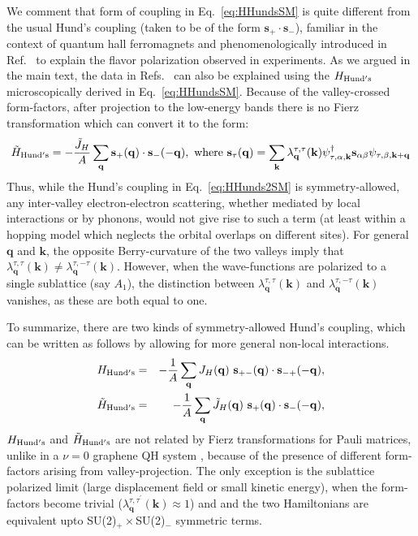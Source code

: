 \documentclass[aps,pra,twocolumn,superscriptaddress,10pt,article,nofootinbib,showpacs,longbibliography]{revtex4-1}
\def \k{{\mathbf k}}
\def \q{{\mathbf q}}
\def \s{{\mathbf s}}
\def \beq{\begin{eqnarray}}
\def \eeq{\end{eqnarray}}
\begin{document}
We comment that form of coupling in Eq.~\eqref{eq:HHundsSM} is quite different from the usual Hund's coupling (taken to be of the form $\s_+ \cdot \s_-$), familiar in the context of quantum hall ferromagnets and phenomenologically introduced in Ref.~ to explain the flavor polarization observed in experiments.
As we argued in the main text, the data in Refs.~ can also be explained using the $H_{\rm Hund's}$ microscopically derived in Eq.~\eqref{eq:HHundsSM}. 
Because of the valley-crossed form-factors, after projection to the low-energy bands there is no Fierz transformation which can convert it to the form:
\beq
\tilde{H}_{\rm Hund's} = - \frac{\tilde{J}_H}{A} \sum_{\q} \s_+(\q) \cdot \s_-(-\q), \text{ where } \s_{\tau}(\q) =  \sum_\k \lambda_{\q}^{\tau, \tau}(\k) \psi^\dagger_{\tau,\alpha,\k} \s_{\alpha  \beta} \psi_{\tau, \beta, \k + \q} 
\label{eq:HHunds2SM}
\eeq
Thus, while the Hund's coupling in Eq.~\eqref{eq:HHunds2SM} is symmetry-allowed, any inter-valley electron-electron scattering, whether mediated by local interactions or by phonons, would not give rise to such a term (at least within a hopping model which neglects the orbital overlaps on different sites).
For general $\q$ and $\k$, the opposite Berry-curvature of the two valleys imply that $\lambda_{\q}^{\tau, \tau}(\k) \neq \lambda_{\q}^{\tau, -\tau}(\k)$.
However, when the wave-functions are polarized to a single sublattice (say $A_1$), the distinction between $ \lambda_{\q}^{\tau, \tau}(\k)$ and $ \lambda_{\q}^{\tau, -\tau}(\k)$ vanishes, as these are both equal to one.


To summarize, there are two kinds of symmetry-allowed Hund's coupling, which can be written as follows by allowing for more general non-local interactions.
\beq
H_{\rm Hund's} &=& - \frac{1}{A} \sum_{\q} J_H(\q) ~ \s_{+-}(\q) \cdot \s_{-+}(-\q), \\
\tilde{H}_{\rm Hund's} &=& - \frac{1}{A} \sum_{\q} \tilde{J}_H(\q) ~ \s_+(\q) \cdot \s_-(-\q), 
\eeq
$H_{\rm Hund's}$ and $\tilde{H}_{\rm Hund's} $ are not related by Fierz transformations for Pauli matrices, unlike in a $\nu = 0$ graphene QH system \cite{Kharitonov}, because of the presence of different form-factors arising from valley-projection.
The only exception is the sublattice polarized limit (large displacement field or small kinetic energy), when the form-factors become trivial ($\lambda^{\tau,\tau^\prime}_\q(\k) \approx 1$) and and the two Hamiltonians are equivalent upto SU(2)$_+\times$SU(2)$_-$ symmetric terms. 
\end{document}
